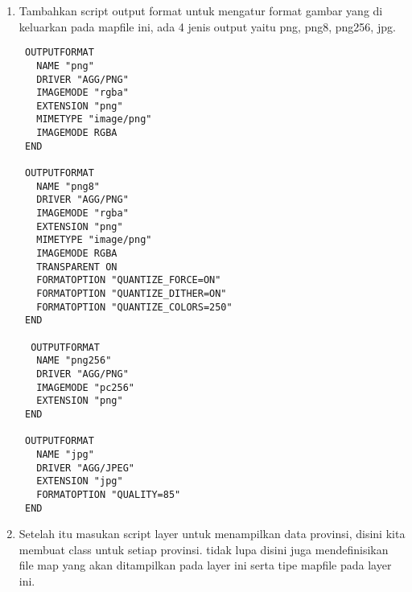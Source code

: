 \begin{enumerate}
\item Tambahkan script output format untuk mengatur format gambar yang di keluarkan pada mapfile ini, ada 4 jenis output yaitu png, png8, png256, jpg.
\begin{lstlisting}
 OUTPUTFORMAT
   NAME "png"
   DRIVER "AGG/PNG"
   IMAGEMODE "rgba"
   EXTENSION "png"
   MIMETYPE "image/png"
   IMAGEMODE RGBA
 END

 OUTPUTFORMAT
   NAME "png8"
   DRIVER "AGG/PNG"
   IMAGEMODE "rgba"
   EXTENSION "png"
   MIMETYPE "image/png"
   IMAGEMODE RGBA
   TRANSPARENT ON
   FORMATOPTION "QUANTIZE_FORCE=ON"
   FORMATOPTION "QUANTIZE_DITHER=ON"
   FORMATOPTION "QUANTIZE_COLORS=250"
 END

  OUTPUTFORMAT
   NAME "png256"
   DRIVER "AGG/PNG"
   IMAGEMODE "pc256"
   EXTENSION "png"
 END

 OUTPUTFORMAT
   NAME "jpg"
   DRIVER "AGG/JPEG"
   EXTENSION "jpg"
   FORMATOPTION "QUALITY=85"
 END
\end{lstlisting}
\item Setelah itu masukan script layer untuk menampilkan data provinsi, disini kita membuat class untuk setiap provinsi. tidak lupa disini juga mendefinisikan file map yang akan ditampilkan pada layer ini serta tipe mapfile pada layer ini. 


\end{enumerate}
